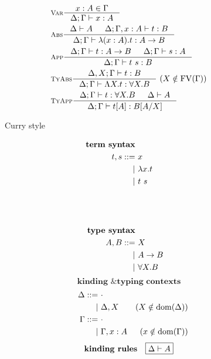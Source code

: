 \begin{figure}
\begin{singlespace}
\begin{minipage}{.46\textwidth}
\begin{align*}
& \inference[\sc Var]{x:A \in \Gamma}{\Delta;\Gamma |- x:A} \\
& \inference[\sc Abs]{\Delta |- A & \Delta;\Gamma,x:A |- t : B}
                     {\Delta;\Gamma |- \l(x:A).t : A -> B} \\
& \inference[\sc App]{\Delta;\Gamma |- t : A -> B & \Delta;\Gamma |- s : A}
                     {\Delta;\Gamma |- t~s : B} \\
& \inference[\sc TyAbs]{\Delta,X;\Gamma |- t : B}
                       {\Delta;\Gamma |- \L X.t : \forall X.B} ~
                       (X\notin\FV(\Gamma)) \\
& \inference[\sc TyApp]{\Delta;\Gamma |- t : \forall X.B & \Delta |- A}
                       {\Delta;\Gamma |- t[A] : B[A/X]}
\end{align*}
\end{minipage}
\begin{minipage}{.46\textwidth}
        \begin{center}Curry style\end{center}
\def\baselinestretch{0}
\small
\begin{align*}
\textbf{term syntax} \\
t,s ::= &~ x           \\
      | &~ \l x    . t \\
      | &~ t ~ s       \\
        &~\phantom{| \L X}  \\
        &~\phantom{| t [A]\vspace*{.1em}} \\
\\
\textbf{type syntax} \\
A,B ::= &~ X \\
      | &~ A -> B \\
      | &~ \forall X . B \\
\end{align*}
\[ \textbf{kinding \& typing contexts} \]\vspace*{-1em}
\begin{align*}\quad
\Delta ::= &~ \cdot \\
         | &~ \Delta, X & (X\notin \mathop{\mathrm{dom}}(\Delta)) \\
\Gamma ::= &~ \cdot \\
         | &~ \Gamma, x:A & (x\notin \mathop{\mathrm{dom}}(\Gamma)) \\
\end{align*}
\[ \textbf{kinding rules} \quad \framebox{$ \Delta |- A $}\]\vspace*{-1em}
\begin{align*}

\end{align*}
\end{minipage}
\end{singlespace}
\end{figure}
